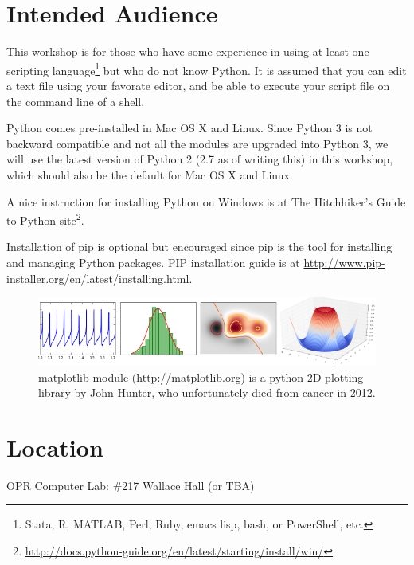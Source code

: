 \documentclass{tufte-handout}
\begin{document}
\section{Intended Audience}\label{sec:intended_audience}
This workshop is for those who have some experience in using at least
one scripting language\footnote{Stata, R, MATLAB, Perl, Ruby, emacs
lisp, bash, or PowerShell, etc.} but who do not know Python. It is
assumed that you can edit a text file using your favorate editor, and be
able to execute your script file on the command line of a shell.

Python comes pre-installed in Mac OS X and Linux. Since Python 3 is not
backward compatible and not all the modules are upgraded into Python 3,
we will use the latest version of Python 2 (2.7 as of writing this) in
this workshop, which should also be the default for Mac OS X and Linux.

A nice instruction for installing Python on Windows is at The
Hitchhiker's Guide to Python
site\footnote{\url{http://docs.python-guide.org/en/latest/starting/install/win/}}.

Installation of pip is optional but encouraged since pip is the tool for
installing and managing Python packages. PIP installation guide is
at \url{http://www.pip-installer.org/en/latest/installing.html}.

\begin{figure}[h]
  \includegraphics[width=0.8\linewidth]{matplotlib.png}%
  \caption{matplotlib module (\url{http://matplotlib.org}) is a python 2D
    plotting library by John Hunter, who unfortunately died from cancer in 2012.}%
  \label{fig:Matplotlib Plot Examples}%
\end{figure}

\section{Location}\label{sec:location}
OPR Computer Lab: \#217 Wallace Hall (or TBA)
\end{document}
